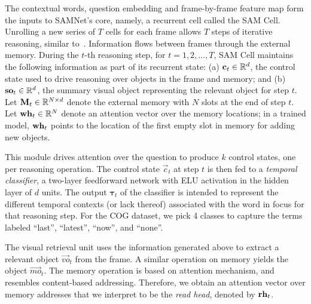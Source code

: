  The contextual words, question embedding and frame-by-frame feature map form the inputs to SAMNet's core, namely, a recurrent cell called the SAM Cell. Unrolling a new series of $T$ cells for each frame allows $T$ steps of iterative reasoning, similar to~\cite{hudson2018compositional}. Information flows between frames through the external memory.
During the $t$-th reasoning step, for $t=1,2, \dots, T$, SAM Cell maintains the following information as part of its recurrent state:
(a) $\mathbf{c}_t \in \mathbb{R}^d$, the control state used to drive reasoning over objects in the frame and memory; and
(b) $\mathbf{so}_t  \in \mathbb{R}^d$, the summary visual object representing the relevant object for step $t$.
Let $\mathbf{M}_t \in  \mathbb{R}^{N \times d}$ denote the external memory with $N$ slots at the end of step $t$.
Let $\mathbf{wh}_t \in  \mathbb{R}^N$ denote an attention vector over the memory locations;
in a trained model, $\mathbf{wh}_t$ points to the location of the first empty slot in memory for adding new objects.

This module drives attention over the question to produce $k$ control states, one per reasoning operation.
The control state $\vec{c}_t$ at step $t$ is then fed to a \emph{temporal classifier},
a two-layer feedforward network with ELU activation in the hidden layer of $d$ units.
The output $\bm{\tau}_t$ of the classifier is intended to represent the different temporal contexts (or lack thereof) associated with the word in focus for that reasoning step.
For the COG dataset, we pick 4 classes to capture the terms labeled ``last'', ``latest'', ``now'', and ``none''.

 The visual retrieval unit uses the information generated above to extract a relevant object $\vec{vo}_t$ from the frame.
A similar operation on memory yields the object $\vec{mo}_t$. The memory operation is based on attention mechanism, and resembles content-based addressing. Therefore, we obtain an attention vector over memory addresses that we interpret to be the \emph{read head}, denoted by $\mathbf{rh}_t$.

